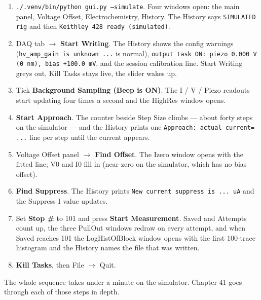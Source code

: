 \begin{enumerate}[leftmargin=*]
\item \texttt{.\discretionary{}{}{}/\discretionary{}{}{}.\discretionary{}{}{}venv/\discretionary{}{}{}bin/\discretionary{}{}{}python gui.\discretionary{}{}{}py --simulate}. Four windows open: the main panel, Voltage Offset, Electrochemistry, History. The History says \texttt{SIMULATED rig} and then \texttt{Keithley 428 ready (simulated)}.
\item DAQ tab $\rightarrow$ \textbf{Start Writing}. The History shows the config warnings (\texttt{hv\_\discretionary{}{}{}amp\_\discretionary{}{}{}gain is unknown .\discretionary{}{}{}.\discretionary{}{}{}.\discretionary{}{}{}} is normal), \texttt{output task ON: piezo 0.\discretionary{}{}{}000 V (0 nm),\discretionary{}{}{} bias +100.\discretionary{}{}{}0 m\discretionary{}{}{}V}, and the session calibration line. Start Writing greys out, Kill Tasks stays live, the slider wakes up.
\item Tick \textbf{Background Sampling (Beep is ON)}. The I / V / Piezo readouts start updating four times a second and the HighRes window opens.
\item \textbf{Start Approach}. The counter beside Step Size climbs --- about forty steps on the simulator --- and the History prints one \texttt{Approach: actual current= .\discretionary{}{}{}.\discretionary{}{}{}.\discretionary{}{}{}} line per step until the current appears.
\item Voltage Offset panel $\rightarrow$ \textbf{Find Offset}. The Izero window opens with the fitted line; V0 and I0 fill in (near zero on the simulator, which has no bias offset).
\item \textbf{Find Suppress}. The History prints \texttt{New current suppress is .\discretionary{}{}{}.\discretionary{}{}{}.\discretionary{}{}{} u\discretionary{}{}{}A} and the Suppress I value updates.
\item Set \textbf{Stop \#} to 101 and press \textbf{Start Measurement}. Saved and Attempts count up, the three PullOut windows redraw on every attempt, and when Saved reaches 101 the LogHistOfBlock window opens with the first 100-trace histogram and the History names the file that was written.
\item \textbf{Kill Tasks}, then File $\rightarrow$ Quit.
\end{enumerate}

The whole sequence takes under a minute on the simulator. Chapter 41 goes through each of those steps in depth.

